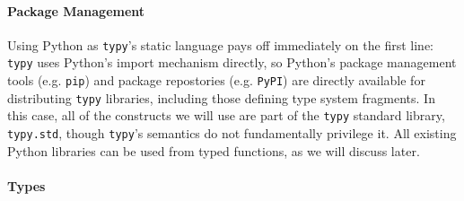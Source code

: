 \documentclass[preprint,10pt]{sigplanconf}
\newcommand{\lip}[1]{\lstinline[language=Python,basicstyle=\ttfamily\small,deletendkeywords={tuple,buffer,map}]{#1}}
\begin{document}
\paragraph{Package Management} Using Python as \verb|typy|'s static language pays off immediately on the first line: \texttt{typy} uses Python's import mechanism directly, so Python's package management tools (e.g. \lip{pip}) and package repostories (e.g. \lip{PyPI}) are directly available for distributing \texttt{typy} libraries, including those defining type system fragments. In this case, all of the constructs we will use are part of the \verb|typy| standard library, \texttt{typy.std}, though \texttt{typy}'s semantics do not fundamentally privilege it. All existing Python libraries can be used from typed functions, as we will discuss later.%



\paragraph{Types}
\end{document}
